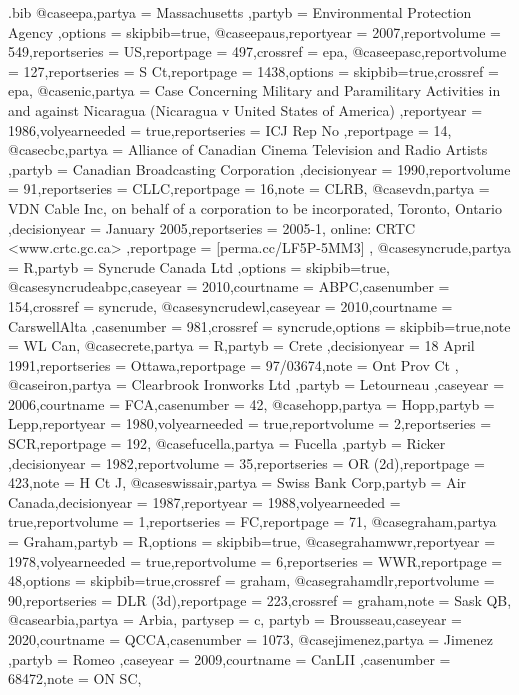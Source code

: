 \begin{filecontents*}[overwrite]{\jobname.bib}
@case{epa,partya = {Massachusetts },partyb = {Environmental Protection Agency },options = {skipbib=true},}
@case{epaus,reportyear = {2007},reportvolume = {549},reportseries = {US},reportpage = {497},crossref = {epa},}
@case{epasc,reportvolume = {127},reportseries = {S Ct},reportpage = {1438},options = {skipbib=true},crossref = {epa},}
@case{nic,partya = {Case Concerning Military and Paramilitary Activities in and against Nicaragua (Nicaragua v United States of America) },reportyear = {1986},volyearneeded = {true},reportseries = {ICJ Rep No },reportpage = {14},}
@case{cbc,partya = {Alliance of Canadian Cinema Television and Radio Artists },partyb = {Canadian Broadcasting Corporation },decisionyear = {1990},reportvolume = {91},reportseries = {CLLC},reportpage = {16},note = {CLRB},}
@case{vdn,partya = {VDN Cable Inc, on behalf of a corporation to be incorporated, Toronto, Ontario },decisionyear = {January 2005},reportseries = {2005-1, online: CRTC <www.crtc.gc.ca> },reportpage = {[perma.cc/LF5P-5MM3] },}
@case{syncrude,partya = {R},partyb = {Syncrude Canada Ltd },options = {skipbib=true},}
@case{syncrudeabpc,caseyear = {2010},courtname = {ABPC},casenumber = {154},crossref = {syncrude},}
@case{syncrudewl,caseyear = {2010},courtname = {CarswellAlta },casenumber = {981},crossref = {syncrude},options = {skipbib=true},note = {WL Can},}
@case{crete,partya = {R},partyb = {Crete },decisionyear = {18 April 1991},reportseries = {Ottawa},reportpage = {97/03674},note = {Ont Prov Ct },}
@case{iron,partya = {Clearbrook Ironworks Ltd },partyb = {Letourneau },caseyear = {2006},courtname = {FCA},casenumber = {42},}
@case{hopp,partya = {Hopp},partyb = {Lepp},reportyear = {1980},volyearneeded = {true},reportvolume = {2},reportseries = {SCR},reportpage = {192},}
@case{fucella,partya = {Fucella },partyb = {Ricker },decisionyear = {1982},reportvolume = {35},reportseries = {OR (2d)},reportpage = {423},note = {H Ct J},}
@case{swissair,partya = {Swiss Bank Corp},partyb = {Air Canada},decisionyear = {1987},reportyear = {1988},volyearneeded = {true},reportvolume = {1},reportseries = {FC},reportpage = {71},}
@case{graham,partya = {Graham},partyb = {R},options = {skipbib=true},}
@case{grahamwwr,reportyear = {1978},volyearneeded = {true},reportvolume = {6},reportseries = {WWR},reportpage = {48},options = {skipbib=true},crossref = {graham},}
@case{grahamdlr,reportvolume = {90},reportseries = {DLR (3d)},reportpage = {223},crossref = {graham},note = {Sask QB},}
@case{arbia,partya = {Arbia},
partysep = {c},
partyb = {Brousseau},caseyear = {2020},courtname = {QCCA},casenumber = {1073},}
@case{jimenez,partya = {Jimenez },partyb = {Romeo },caseyear = {2009},courtname = {CanLII },casenumber = {68472},note = {ON SC},}

\end{filecontents*}
